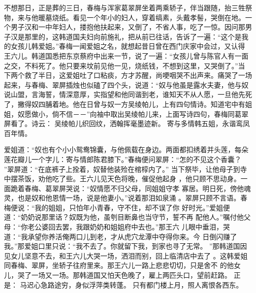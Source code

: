不想那日，正是葬的三日，春梅与浑家葛翠屏坐着两乘轿子，伴当跟随，抬三牲祭
物，来与他暖墓烧纸。看见一个年小的妇人，穿着缟素，头戴孝髻，哭倒在地。一
个男子汉和一中年妇人，搂抱他扶起来，又倒了，不省人事，吃了一惊。因问那男
子汉是那里的，这韩道国夫妇向前施礼，把从前已往话，告诉了一遍：“这个是我
的女孩儿韩爱姐。”春梅一闻爱姐之名，就想起昔日曾在西门庆家中会过，又认得
王六儿。韩道国悉把东京蔡府中出来一节，说了一遍：“女孩儿曾与陈官人有一面
之交，不料死了。他只要来坟前见他一见，烧纸钱，不想到这里，又哭倒了。”当
下两个救了半日，这爱姐吐了口粘痰，方才苏醒，尚哽咽哭不出声来。痛哭了一场
起来，与春梅、翠屏插烛也似磕了四个头，说道：“奴与他虽是露水夫妻，他与奴
说山盟，言海誓，情深意厚，实指望和他同谐到老，谁知天不从人愿，一旦他先死
了，撇得奴四脯着地。他在日曾与奴一方吴绫帕儿，上有四句情诗。知道宅中有姐
姐，奴愿做小，倘不信－－”向袖中取出吴绫帕儿来，上面写诗四句，春梅同葛翠
屏看了。诗云：
吴绫帕儿织回纹，洒翰挥毫墨迹新。
寄与多情韩五姐，永谐鸾凤百年情。

爱姐道：“奴也有个小小鸳鸯锦囊，与他佩载在身边。两面都扣绣着并头莲，每朵
莲花瓣儿一个字儿：寄与情郎陈君膝下。”春梅便问翠屏：“怎的不见这个香囊？
”翠屏道：“在底裤子上拴着，奴替他装殓在棺椁内了。”
当下祭毕，让他母子到寺中摆茶饭，劝他吃了些。王六儿见天色将晚，催促他起身
，他只顾不思动身。一面跪着春梅、葛翠屏哭说：“奴情愿不归父母，同姐姐守孝
寡居。明日死，傍他魂灵，也是奴和他恩情一场，说是他妻小。”说着那泪如泉涌
。翠屏只顾不言语。春梅便说：“我的姐姐，只怕年小青春，守不住，却不误了你
好时光。”爱姐便道：“奶奶说那里话？奴既为他，虽刳目断鼻也当守节，誓不再
配他人。”嘱付他父母：“你老公婆回去罢，我跟奶奶和姐姐府中去也。”那王六
儿眼中垂泪，哭道：“我承望你养活俺两口儿到老，才从虎穴龙潭中夺得你来。今
日倒闪赚了我。”那爱姐口里只说：“我不去了。你就留下我，到家也寻了无常。
”那韩道国因见女儿坚意不去，和王六儿大哭一场，洒泪而别，回上临清店中去了
。这韩爱姐同春梅、翠屏，坐轿子往府里来。那王六儿一路上悲悲切切，只是舍不
的他女儿，哭了一场又一场。那韩道国又怕天色晚了，雇上两匹头口，望前赶路。
正是：
马迟心急路途穷，身似浮萍类转蓬。
只有都门楼上月，照人离恨各西东。